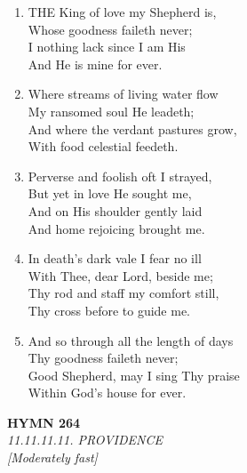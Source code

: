 \documentclass[11pt,a4paper]{article}
\begin{document}
\begin{enumerate}
    \item THE King of love my Shepherd is, \\
            Whose goodness faileth never; \\
        I nothing lack since I am His \\
            And He is mine for ever.

    \item Where streams of living water flow \\
            My ransomed soul He leadeth; \\
        And where the verdant pastures grow, \\
            With food celestial feedeth.

    \item Perverse and foolish oft I strayed, \\
            But yet in love He sought me, \\
        And on His shoulder gently laid \\
            And home rejoicing brought me.

    \item In death's dark vale I fear no ill \\
            With Thee, dear Lord, beside me; \\
        Thy rod and staff my comfort still, \\
            Thy cross before to guide me.

    \item And so through all the length of days \\
            Thy goodness faileth never; \\
        Good Shepherd, may I sing Thy praise \\
            Within God's house for ever.

\end{enumerate}

\newpage
\begin{center}
    {\Large \textbf{HYMN 264}}
    \\
    \textit{11.11.11.11. PROVIDENCE}
    \\
    \textit{\small [Moderately fast]}
\end{center}
\vspace{1em}
\end{document}
